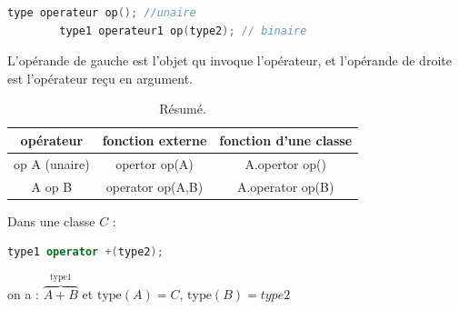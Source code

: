 \documentclass[12pt,a4paper]{article}
\begin{document}
	\begin{lstlisting}[language=C++,caption=Prototype générique.]
		type operateur op(); //unaire
		type1 operateur1 op(type2); // binaire
	\end{lstlisting}
	
	L'opérande de gauche est l'objet qu invoque l'opérateur, et l'opérande de droite est l'opérateur reçu en argument.
	
	\begin{table}[h!]
		\centering
		\begin{tabular}{c|c|c}
		opérateur & fonction externe & fonction d'une classe \\
		\hline
		\hline
		op A (unaire) & opertor op(A) & A.opertor op()\\
		\hline
		A op B & operator op(A,B) & A.operator op(B)
	\end{tabular}
	\caption{Résumé.}
	\end{table}
	
	Dans une classe $C$ :
	\begin{lstlisting}[language=C++]
		type1 operator +(type2);
	\end{lstlisting}
	on a : $\overbrace{A+B}^{\text{type1}}$ et $\mathrm{type}(A) = C$, $\mathrm{type}(B) = type2$
	
\end{document}
